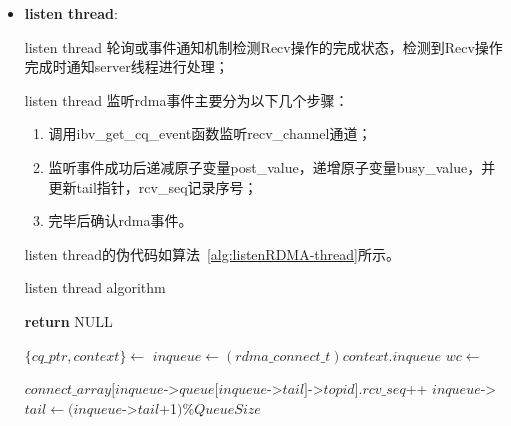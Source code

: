 {    \begin{itemize}
        \item \textbf{listen thread}:

              listen thread 轮询或事件通知机制检测Recv操作的完成状态，检测到Recv操作完成时通知server线程进行处理；

              listen thread 监听rdma事件主要分为以下几个步骤：
              \begin{enumerate}[leftmargin=*, nosep]
                  \item 调用ibv\_get\_cq\_event函数监听recv\_channel通道；
                  \item 监听事件成功后递减原子变量post\_value，递增原子变量busy\_value，并更新tail指针，rcv\_seq记录序号；
                  \item 完毕后确认rdma事件。
              \end{enumerate}

              listen thread的伪代码如算法~\ref{alg:listenRDMA-thread}所示。
              \begin{algorithm}
                  \caption{listen thread algorithm}\label{alg:listenRDMA-thread}
                  \begin{algorithmic}[1] %
                      \State {}
                      \State \textbf{return} NULL
                      \EndProcedure

                      \State $\{ cq\_ptr, context\} \gets$ 
                      \State $inqueue \gets (rdma\_connect\_t)context.inqueue$
                      \State {}
                      \State $wc \gets$ 

                      \State
                      \State {}
                      \Else
                      \State {}
                      \State {}

                      \State
                      \State $connect\_array[inqueue$->$queue[inqueue$->$tail]$->$topid].rcv\_seq $++
                      \State $inqueue$->$tail \gets (inqueue$->$tail$+1$) \% QueueSize$
                      \EndIf
                      \EndWhile


\end{algorithmic}
\end{algorithm}
\end{itemize}}
